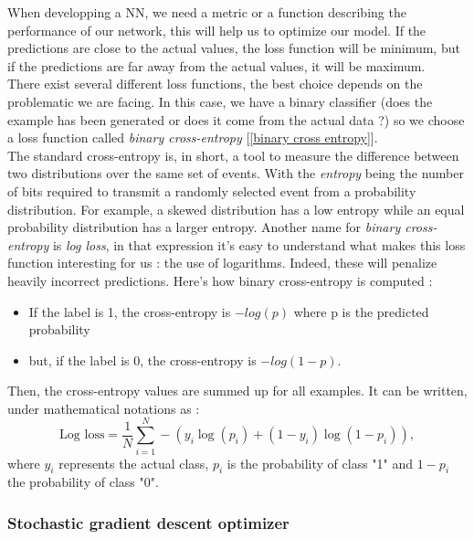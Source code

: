 \documentclass [12pt] {article}
\numberwithin{equation}{section} %
\numberwithin{figure}{section}   %
\begin{document}
When developping a NN, we need a metric or a function describing the performance of our network, this will help us to optimize our model. If the predictions are close to the actual values, the loss function will be minimum, but if the predictions are far away from the actual values, it will be maximum. \\
There exist several different loss functions, the best choice depends on the problematic we are facing. In this case, we have a binary classifier (does the example has been generated or does it come from the actual data ?) so we choose a loss function called \textit{binary cross-entropy} [\ref{binary cross entropy}].\\
The standard cross-entropy is, in short, a tool to measure the difference between two distributions over the same set of events. With the \textit{entropy} being the number of bits required to transmit a randomly selected event from a probability distribution. For example, a skewed distribution has a low entropy while an equal probability distribution has a larger entropy. Another name for \textit{binary cross-entropy} is \textit{log loss}, in that expression it's easy to understand what makes this loss function interesting for us : the use of logarithms. Indeed, these will penalize heavily incorrect predictions. Here's how binary cross-entropy is computed :
\begin{itemize}
    \item If the label is 1, the cross-entropy is $-log(p)$ where p is the predicted probability
    \item but, if the label is 0, the cross-entropy is $-log(1 - p)$.
\end{itemize}
Then, the cross-entropy values are summed up for all examples. It can be written, under mathematical notations as : 
\begin{equation}
    \text{Log loss} = \frac{1}{N} \sum^N_{i=1} -\left( y_i \log(p_i) + (1-y_i) \log(1-p_i) \right),
\end{equation}
where $y_i$ represents the actual class, $p_i$ is the probability of class "1" and $1-p_i$ the probability of class "0".

\subsubsection*{Stochastic gradient descent optimizer}
\end{document}
